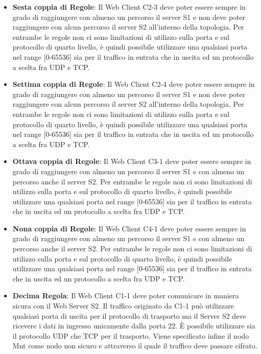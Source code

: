 \begin{itemize}
    \item \textbf{Sesta coppia di Regole}: Il Web Client C2-3 deve poter essere sempre in grado di raggiungere con almeno un percorso il server S1 e non deve poter raggiungere con alcun percorso il server S2 all'interno della topologia. Per entrambe le regole non ci sono limitazioni di utilizzo sulla porta e sul protocollo di quarto livello, è quindi possibile utilizzare una qualsiasi porta nel range [0-65536] sia per il traffico in entrata che in uscita ed un protocollo a scelta fra UDP e TCP.
    \item \textbf{Settima coppia di Regole}: Il Web Client C2-4 deve poter essere sempre in grado di raggiungere con almeno un percorso il server S1 e non deve poter raggiungere con alcun percorso il server S2 all'interno della topologia. Per entrambe le regole non ci sono limitazioni di utilizzo sulla porta e sul protocollo di quarto livello, è quindi possibile utilizzare una qualsiasi porta nel range [0-65536] sia per il traffico in entrata che in uscita ed un protocollo a scelta fra UDP e TCP.
    \item \textbf{Ottava coppia di Regole}: Il Web Client C3-1 deve poter essere sempre in grado di raggiungere con almeno un percorso il server S1 e con almeno un percorso anche il server S2. Per entrambe le regole non ci sono limitazioni di utilizzo sulla porta e sul protocollo di quarto livello, è quindi possibile utilizzare una qualsiasi porta nel range [0-65536] sia per il traffico in entrata che in uscita ed un protocollo a scelta fra UDP e TCP.
    \item \textbf{Nona coppia di Regole}: Il Web Client C4-1 deve poter essere sempre in grado di raggiungere con almeno un percorso il server S1 e con almeno un percorso anche il server S2. Per entrambe le regole non ci sono limitazioni di utilizzo sulla porta e sul protocollo di quarto livello, è quindi possibile utilizzare una qualsiasi porta nel range [0-65536] sia per il traffico in entrata che in uscita ed un protocollo a scelta fra UDP e TCP.
    \item \textbf{Decima Regola}: Il Web Client C1-1 deve poter comunicare in maniera sicura con il Web Server S2. Il traffico originato da C1-1 può utilizzare qualsiasi porta di uscita per il protocollo di trasporto ma il Server S2 deve ricevere i dati in ingresso unicamente dalla porta 22. È possibile utilizzare sia il protocollo UDP che TCP per il trasporto. Viene specificato infine il nodo Mnt come nodo non sicuro e attraverso il quale il traffico deve passare cifrato.
\end{itemize}

